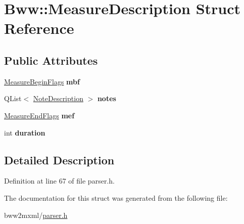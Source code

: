 \hypertarget{struct_bww_1_1_measure_description}{}\section{Bww\+:\+:Measure\+Description Struct Reference}
\label{struct_bww_1_1_measure_description}
\subsection*{Public Attributes}
\begin{DoxyCompactItemize}
\item 
\mbox{\label{struct_bww_1_1_measure_description_a2cbab87d32d6b2255bcaa0c23f0d9eca}} 
\hyperlink{struct_bww_1_1_measure_begin_flags}{Measure\+Begin\+Flags} {\bfseries mbf}
\item 
\mbox{\label{struct_bww_1_1_measure_description_aa7f4e690886e3bd7a6cce4ff4e1291bb}} 
Q\+List$<$ \hyperlink{struct_bww_1_1_note_description}{Note\+Description} $>$ {\bfseries notes}
\item 
\mbox{\label{struct_bww_1_1_measure_description_a72207a10110c34b16891d9edaed4679b}} 
\hyperlink{struct_bww_1_1_measure_end_flags}{Measure\+End\+Flags} {\bfseries mef}
\item 
\mbox{\label{struct_bww_1_1_measure_description_a74ad237cd1601a32f07fa63af00c2594}} 
int {\bfseries duration}
\end{DoxyCompactItemize}


\subsection{Detailed Description}


Definition at line 67 of file parser.\+h.



The documentation for this struct was generated from the following file\+:\begin{DoxyCompactItemize}
\item 
bww2mxml/\hyperlink{bww2mxml_2parser_8h}{parser.\+h}\end{DoxyCompactItemize}

